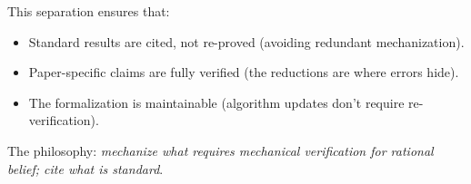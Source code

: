 This separation ensures that:
\begin{itemize}
\item Standard results are cited, not re-proved (avoiding redundant mechanization).
\item Paper-specific claims are fully verified (the reductions are where errors hide).
\item The formalization is maintainable (algorithm updates don't require re-verification).
\end{itemize}

The philosophy: \emph{mechanize what requires mechanical verification for rational belief; cite what is standard}.